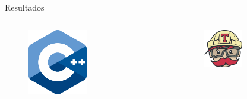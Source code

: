 \documentclass{beamer}
\begin{document}
\begin{frame}{Resultados}
\begin{columns}
        \center
        \begin{figure}
            \includegraphics[width=0.5\textwidth]{cpp.png}
        \end{figure}
        \begin{figure}
            \includegraphics[width=0.5\textwidth]{travis.png}
        \end{figure}
        
    \end{columns}

\end{frame}
\end{document}
